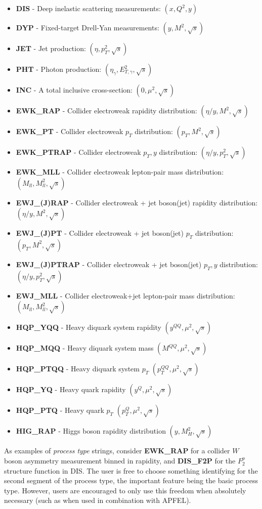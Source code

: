 \documentclass[11pt]{article}
\begin{document}
\begin{itemize}
\item \textbf{DIS} - Deep inelastic scattering measurements: $(x,Q^2,y)$
\item \textbf{DYP} - Fixed-target Drell-Yan measurements: $(y,M^2,\sqrt{s})$
\item \textbf{JET} - Jet production: $(\eta,p_T^2,\sqrt{s})$
\item \textbf{PHT} - Photon production: $(\eta_\gamma,E_{T,\gamma}^2,\sqrt{s})$
\item \textbf{INC} - A total inclusive cross-section: $(0,\mu^2,\sqrt{s})$
\item \textbf{EWK\_RAP} - Collider electroweak rapidity distribution: $(\eta/y,M^2,\sqrt{s})$
\item \textbf{EWK\_PT} - Collider electroweak $p_T$ distribution: $(p_T,M^2,\sqrt{s})$
\item \textbf{EWK\_PTRAP} - Collider electroweak $p_T, y$ distribution: $(\eta/y, p_T^2,\sqrt{s})$
\item \textbf{EWK\_MLL} - Collider electroweak lepton-pair mass distribution: $(M_{ll},M_{ll}^2,\sqrt{s})$
\item \textbf{EWJ\_(J)RAP} - Collider electroweak + jet boson(jet) rapidity distribution: $(\eta/y,M^2,\sqrt{s})$
\item \textbf{EWJ\_(J)PT} - Collider electroweak + jet boson(jet) $p_T$ distribution: $(p_T,M^2,\sqrt{s})$
\item \textbf{EWJ\_(J)PTRAP} - Collider electroweak + jet boson(jet) $p_T, y$ distribution: $(\eta/y, p_T^2,\sqrt{s})$
\item \textbf{EWJ\_MLL} - Collider electroweak+jet lepton-pair mass distribution: $(M_{ll},M_{ll}^2,\sqrt{s})$
\item \textbf{HQP\_YQQ} - Heavy diquark system rapidity $(y^{QQ},\mu^2,\sqrt{s})$
\item \textbf{HQP\_MQQ} - Heavy diquark system mass $(M^{QQ},\mu^2,\sqrt{s})$
\item \textbf{HQP\_PTQQ} - Heavy diquark system $p_T$ $(p_T^{QQ},\mu^2,\sqrt{s})$
\item \textbf{HQP\_YQ} - Heavy quark rapidity $(y^Q,\mu^2,\sqrt{s})$
\item \textbf{HQP\_PTQ} - Heavy quark $p_T$ $(p_T^Q,\mu^2,\sqrt{s})$
\item \textbf{HIG\_RAP} - Higgs boson rapidity distribution $(y,M_H^2,\sqrt{s})$
\end{itemize}

As examples of \emph{process type} strings, consider \textbf{EWK\_RAP} for a collider $W$ boson asymmetry measurement binned in rapidity, and \textbf{DIS\_F2P} for the $F_2^p$ structure function in DIS. The user is free to choose something identifying for the second segment of the process type, the important feature being the basic process type. However, users are encouraged to only use this freedom when absolutely necessary (such as when used in combination with APFEL).
\end{document}
